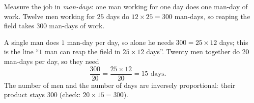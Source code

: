 Measure the job in \emph{man-days}: one man working for one day does one man-day of work. Twelve men working for $25$ days do $12\times25=300$ man-days, so reaping the field takes $300$ man-days of work.

A single man does $1$ man-day per day, so alone he needs $300=25\times12$ days; this is the line ``$1$ man can reap the field in $25\times12$ days''. Twenty men together do $20$ man-days per day, so they need
\[
\dfrac{300}{20}=\dfrac{25\times12}{20}=\boxed{15}\text{ days}.
\]
The number of men and the number of days are inversely proportional: their product stays $300$ (check: $20\times15=300$).
